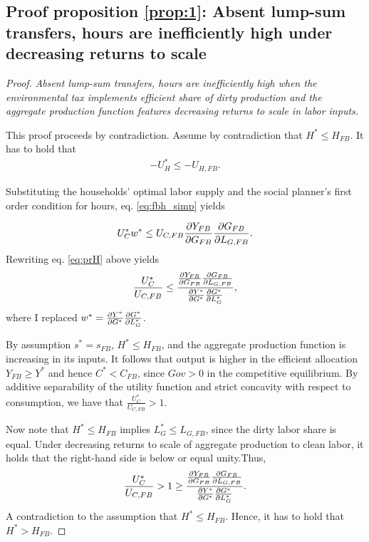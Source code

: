 \subsection{Proof proposition \ref{prop:1}: Absent lump-sum transfers, hours are inefficiently high under decreasing returns to scale}\label{app:nolumpsum_hourshigh}
\begin{proof}\textit{Absent lump-sum transfers, hours are inefficiently high when the environmental tax implements efficient share of dirty production and the aggregate production function features decreasing returns to scale in labor inputs.}
	
	This proof proceeds by contradiction. 
	Assume by contradiction that $H^*\leq H_{FB}$. 
	It has to hold that 
	\begin{align}
	-U_H^*\leq -U_{H,FB}.\nonumber
	\end{align} 
	
	Substituting the households' optimal labor supply and the social planner's first order condition for hours, eq. \eqref{eq:fbh_simp} yields
	
	\begin{align}\label{eq:prH}
	U_C^*w^* \leq U_{C,FB}\frac{\partial{Y_{FB}}}{\partial{G_{FB}}}\frac{\partial{G_{FB}}}{\partial{L_{G,FB}}}.
	\end{align}	
	Rewriting eq. \eqref{eq:prH} above yields
	\begin{align}
	\frac{U_C^*}{U_{C,FB}}\leq \frac{\frac{\partial{Y_{FB}}}{\partial{G_{FB}}}\frac{\partial{G_{FB}}}{\partial{L_{G,FB}}}}{\frac{\partial{Y^*}}{\partial{G^*}}\frac{\partial{G^*}}{\partial{L^*_{G}}}},\nonumber
	\end{align}
	where I replaced $w^*=\frac{\partial{Y^*}}{\partial{G^*}}\frac{\partial{G^*}}{\partial{L^*_{G}}}$.
	
	By assumption $s^*=s_{FB}$, $H^*\leq H_{FB}$, and the aggregate production function is increasing in its inputs. It follows that output is higher in the efficient allocation $Y_{FB}\geq Y^*$ and hence $C^*<C_{FB}$, since $Gov>0$ in the competitive equilibrium. By additive separability of the utility function and strict concavity with respect to consumption, we have that $\frac{U_C^*}{U_{C,FB}}>1$.
	
	Now note that $H^*\leq H_{FB}$ implies  $L_G^*\leq L_{G,FB}$, since the dirty labor share is equal. Under decreasing returns to scale of aggregate production to clean labor, it holds that the right-hand side is below or equal unity.Thus,
	\begin{align}
	\frac{U_C^*}{U_{C,FB}}>1\geq \frac{\frac{\partial{Y_{FB}}}{\partial{G_{FB}}}\frac{\partial{G_{FB}}}{\partial{L_{G,FB}}}}{\frac{\partial{Y^*}}{\partial{G^*}}\frac{\partial{G^*}}{\partial{L^*_{G}}}}. \nonumber
	\end{align}
	A contradiction to the assumption that $H^*\leq H_{FB}$. Hence, it has to hold that $H^*>H_{FB}$. 
\end{proof}

